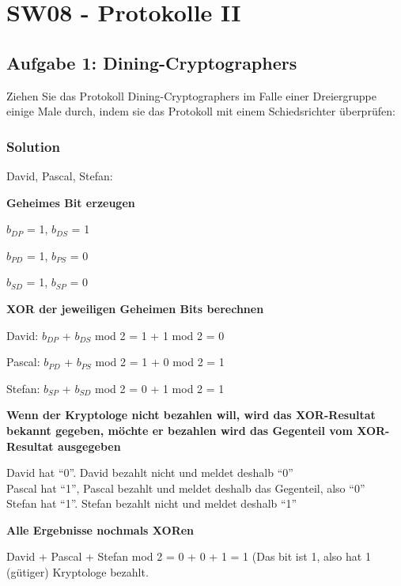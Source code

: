 \documentclass[11pt]{article}
\begin{document}
    \hypertarget{sw08---protokolle-ii}{%
\section{SW08 - Protokolle II}\label{sw08---protokolle-ii}}

    \hypertarget{aufgabe-1-dining-cryptographers}{%
\subsection{Aufgabe 1:
Dining-Cryptographers}\label{aufgabe-1-dining-cryptographers}}

Ziehen Sie das Protokoll Dining-Cryptographers im Falle einer
Dreiergruppe einige Male durch, indem sie das Protokoll mit einem
Schiedsrichter überprüfen:

\hypertarget{solution}{%
\subsubsection{Solution}\label{solution}}

David, Pascal, Stefan:

\textbf{Geheimes Bit erzeugen}

\(b_{DP}\) = 1, \(b_{DS}\) = 1

\(b_{PD}\) = 1, \(b_{PS}\) = 0

\(b_{SD}\) = 1, \(b_{SP}\) = 0

\textbf{XOR der jeweiligen Geheimen Bits berechnen}

David: \(b_{DP}\) + \(b_{DS}\) mod 2 = 1 + 1 mod 2 = 0

Pascal: \(b_{PD}\) + \(b_{PS}\) mod 2 = 1 + 0 mod 2 = 1

Stefan: \(b_{SP}\) + \(b_{SD}\) mod 2 = 0 + 1 mod 2 = 1

\textbf{Wenn der Kryptologe nicht bezahlen will, wird das XOR-Resultat
bekannt gegeben, möchte er bezahlen wird das Gegenteil vom XOR-Resultat
ausgegeben}

David hat ``0''. David bezahlt nicht und meldet deshalb ``0''\\
Pascal hat ``1'', Pascal bezahlt und meldet deshalb das Gegenteil, also
``0''\\
Stefan hat ``1''. Stefan bezahlt nicht und meldet deshalb ``1''

\textbf{Alle Ergebnisse nochmals XORen}

David + Pascal + Stefan mod 2 = 0 + 0 + 1 = 1 (Das bit ist 1, also hat 1
(gütiger) Kryptologe bezahlt.

\newpage
\end{document}
